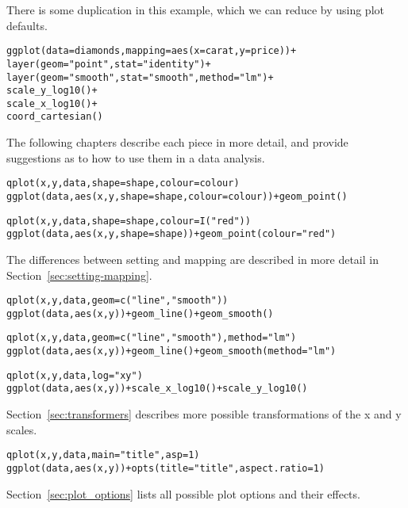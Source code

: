There is some duplication in this example, which we can reduce by using plot defaults.

\begin{alltt}
ggplot(data = diamonds, mapping = aes(x = carat, y = price)) + 
layer(geom = "point", stat = "identity") + 
layer(geom = "smooth", stat = "smooth", method = "lm") + 
scale_y_log10() + 
scale_x_log10() + 
coord_cartesian()
\end{alltt}

The following chapters describe each piece in more detail, and provide suggestions as to how to use them in a data analysis.


\begin{alltt}
qplot(x, y, data, shape=shape, colour = colour)
ggplot(data, aes(x, y, shape=shape, colour = colour)) + geom_point()
\end{alltt}

\begin{alltt}
qplot(x, y, data, shape=shape, colour = I("red"))
ggplot(data, aes(x, y, shape=shape)) + geom_point(colour="red")
\end{alltt}

The differences between setting and mapping are described in more detail in Section~\ref{sec:setting-mapping}.

\begin{alltt}
qplot(x, y, data, geom=c("line", "smooth"))
ggplot(data, aes(x, y)) + geom_line() + geom_smooth()
\end{alltt}

\begin{alltt}
qplot(x, y, data, geom=c("line", "smooth"), method="lm")
ggplot(data, aes(x, y)) + geom_line() + geom_smooth(method="lm")
\end{alltt}


\begin{alltt}
qplot(x, y, data, log="xy")
ggplot(data, aes(x, y)) + scale_x_log10() + scale_y_log10()
\end{alltt}

Section~\ref{sec:transformers} describes more possible transformations of the x and y scales.

\begin{alltt}
qplot(x, y, data, main="title", asp = 1)
ggplot(data, aes(x, y)) + opts(title = "title", aspect.ratio = 1)
\end{alltt}

Section~\ref{sec:plot_options} lists all possible plot options and their effects.


